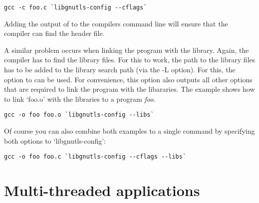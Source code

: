 \begin{verbatim}
gcc -c foo.c `libgnutls-config --cflags`
\end{verbatim}

Adding the output of  to the compilers
command line will ensure that the compiler can find the \gnutls{} header
file.

A similar problem occurs when linking the program with the library.
Again, the compiler has to find the library files.  For this to work,
the path to the library files has to be added to the library search
path (via the -L option).  For this, the option
 to  can be used.  For
convenience, this option also outputs all other options that are
required to link the program with the \gnutls{} libararies.
The example shows how to link `foo.o'
with the \gnutls{} libraries to a program \emph{foo}.

\begin{verbatim}
gcc -o foo foo.o `libgnutls-config --libs`
\end{verbatim}

Of course you can also combine both examples to a single command by
specifying both options to `libgnutls-config':

\begin{verbatim}
gcc -o foo foo.c `libgnutls-config --cflags --libs`
\end{verbatim}


\section{Multi-threaded applications}

